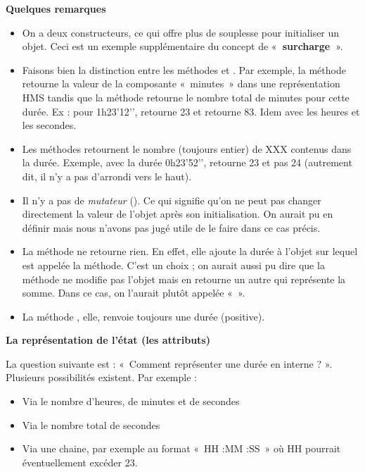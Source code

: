 \bigskip

{\bfseries
Quelques remarques}

\liststyleListv
\begin{itemize}
	\item {
		On a deux constructeurs, ce qui offre plus de souplesse pour initialiser
		un objet. Ceci est un exemple supplémentaire du concept de
		«\textbf{~surcharge~}».}
	\item {
		Faisons bien la distinction entre les méthodes
		 et . Par
		exemple, la méthode  retourne la valeur
		de la composante «~minutes~» dans une représentation HMS tandis que la
		méthode  retourne le nombre total
		de minutes pour cette durée. Ex : pour 1h23’12’’,
		 retourne 23 et
		 retourne 83. Idem avec les heures
		et les secondes.}
	\item {
		Les méthodes  retournent le nombre
		(toujours entier) de XXX contenus dans la durée. Exemple, avec la durée
		0h23’52'’, 
		retourne 23 et pas 24 (autrement dit, il n’y a pas d’arrondi vers le
		haut).}
	\item {
		Il n’y a pas de \textit{mutateur }(). Ce qui
		signifie qu’on ne peut pas changer directement la valeur de l’objet
		après son initialisation. On aurait pu en définir mais nous
		n'avons pas jugé utile de le faire dans ce cas
		précis.}
	\item {
		La méthode  ne retourne rien. En effet,
		elle ajoute la durée à l’objet sur lequel est appelée la méthode. C’est
		un choix ; on aurait aussi pu dire que la méthode ne modifie pas
		l’objet mais en retourne un autre qui représente la somme. Dans ce cas,
		on l’aurait plutôt appelée «~».}
	\item {
		La méthode , elle, renvoie toujours une
		durée (positive).}
\end{itemize}

{\sffamily\bfseries
La représentation de l'état (les attributs)}

La question suivante est : «~Comment représenter une durée en interne ?
». Plusieurs possibilités existent. Par exemple :

\liststyleListv
\begin{itemize}
	\item 
		Via le nombre d’heures, de minutes et de secondes
	\item 
		Via le nombre total de secondes
	\item 
		Via une chaine, par exemple au format «~HH :MM :SS~» où HH pourrait
		éventuellement excéder 23.
\end{itemize}

